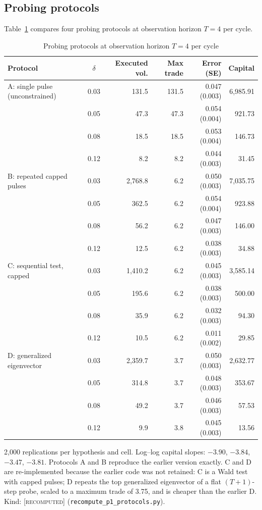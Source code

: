 \documentclass[12pt]{article}
\theoremstyle{definition}
\theoremstyle{remark}
\newcommand{\lab}[1]{\textsc{[#1]}}
\begin{document}
\subsection{Probing protocols}
Table~\ref{tab:protocols} compares four probing protocols at observation horizon $T=4$ per cycle.

\begin{table}[!htbp]\centering\small
\begin{threeparttable}
\caption{Probing protocols at observation horizon $T=4$ per cycle}\label{tab:protocols}
\begin{tabular}{lcrrrr}
\toprule
Protocol & $\delta$ & Executed vol. & Max trade & Error (SE) & Capital\\
\midrule
A: single pulse (unconstrained) & 0.03 & 131.5 & 131.5 & 0.047 (0.003) & 6{,}985.91\\
 & 0.05 & 47.3 & 47.3 & 0.054 (0.004) & 921.73\\
 & 0.08 & 18.5 & 18.5 & 0.053 (0.004) & 146.73\\
 & 0.12 & 8.2 & 8.2 & 0.044 (0.003) & 31.45\\
B: repeated capped pulses & 0.03 & 2{,}768.8 & 6.2 & 0.050 (0.003) & 7{,}035.75\\
 & 0.05 & 362.5 & 6.2 & 0.054 (0.004) & 923.88\\
 & 0.08 & 56.2 & 6.2 & 0.047 (0.003) & 146.00\\
 & 0.12 & 12.5 & 6.2 & 0.038 (0.003) & 34.88\\
C: sequential test, capped & 0.03 & 1{,}410.2 & 6.2 & 0.045 (0.003) & 3{,}585.14\\
 & 0.05 & 195.6 & 6.2 & 0.038 (0.003) & 500.00\\
 & 0.08 & 35.9 & 6.2 & 0.032 (0.003) & 94.30\\
 & 0.12 & 10.5 & 6.2 & 0.011 (0.002) & 29.85\\
D: generalized eigenvector & 0.03 & 2{,}359.7 & 3.7 & 0.050 (0.003) & 2{,}632.77\\
 & 0.05 & 314.8 & 3.7 & 0.048 (0.003) & 353.67\\
 & 0.08 & 49.2 & 3.7 & 0.046 (0.003) & 57.53\\
 & 0.12 & 9.9 & 3.8 & 0.045 (0.003) & 13.56\\
\bottomrule
\end{tabular}
\begin{tablenotes}\footnotesize\item 2{,}000 replications per hypothesis and cell. Log--log capital slopes: $-3.90$, $-3.84$, $-3.47$, $-3.81$. Protocols A and B reproduce the earlier version exactly. C and D are re-implemented because the earlier code was not retained: C is a Wald test with capped pulses; D repeats the top generalized eigenvector of a flat $(T+1)$-step probe, scaled to a maximum trade of 3.75, and is cheaper than the earlier D. Kind: \lab{recomputed} (\texttt{recompute\_p1\_protocols.py}).\end{tablenotes}
\end{threeparttable}
\end{table}
\end{document}
